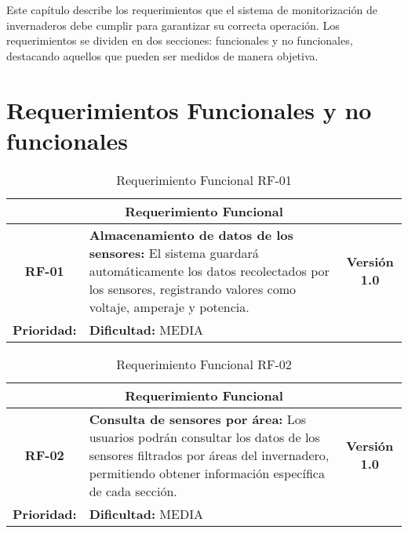 
Este capítulo describe los requerimientos que el sistema de monitorización de invernaderos debe cumplir para garantizar su correcta operación. Los requerimientos se dividen en dos secciones: funcionales y no funcionales, destacando aquellos que pueden ser medidos de manera objetiva.

\section{Requerimientos Funcionales y no funcionales}

\renewcommand{\arraystretch}{1.5} %

\begin{table}[h]
\centering
\begin{tabular}{|c|p{10cm}|c|}
\hline
\multicolumn{3}{|c|}{\textbf{Requerimiento Funcional}} \\ \hline
\textbf{RF-01} & \textbf{Almacenamiento de datos de los sensores:} El sistema guardará automáticamente los datos recolectados por los sensores, registrando valores como voltaje, amperaje y potencia. & \textbf{Versión 1.0} \\ \hline
\multicolumn{1}{|l|}{\textbf{Prioridad:}} MEDIA & \multicolumn{2}{l|}{\textbf{Dificultad:} MEDIA} \\ \hline
\end{tabular}
\caption{Requerimiento Funcional RF-01}
\end{table}
\vspace{1cm} %

\begin{table}[h]
\centering
\begin{tabular}{|c|p{10cm}|c|}
\hline
\multicolumn{3}{|c|}{\textbf{Requerimiento Funcional}} \\ \hline
\textbf{RF-02} & \textbf{Consulta de sensores por área:} Los usuarios podrán consultar los datos de los sensores filtrados por áreas del invernadero, permitiendo obtener información específica de cada sección. & \textbf{Versión 1.0} \\ \hline
\multicolumn{1}{|l|}{\textbf{Prioridad:}} MEDIA & \multicolumn{2}{l|}{\textbf{Dificultad:} MEDIA} \\ \hline
\end{tabular}
\caption{Requerimiento Funcional RF-02}
\end{table}
\vspace{1cm} %

